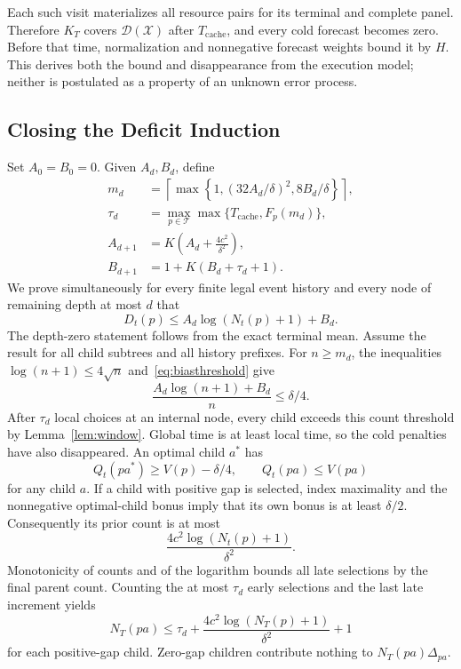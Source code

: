 Each such visit materializes all resource pairs for its terminal and complete panel. Therefore $K_T$ covers $\mathcal D(\mathcal X)$ after $T_{\mathrm{cache}}$, and every cold forecast becomes zero. Before that time, normalization and nonnegative forecast weights bound it by $H$. This derives both the bound and disappearance from the execution model; neither is postulated as a property of an unknown error process.

\subsection{Closing the Deficit Induction}
Set $A_0=B_0=0$. Given $A_d,B_d$, define
\begin{align}
 m_d&=\left\lceil\max\left\{1,
             (32A_d/\delta)^2,8B_d/\delta\right\}\right\rceil,
 \label{eq:biasthreshold}\\
 \tau_d&=\max_{p\in\mathcal T}\max\{T_{\mathrm{cache}},F_p(m_d)\},\nonumber\\
 A_{d+1}&=K\left(A_d+\frac{4c^2}{\delta^2}\right),\nonumber\\
 B_{d+1}&=1+K(B_d+\tau_d+1).\nonumber
\end{align}
We prove simultaneously for every finite legal event history and every node of remaining depth at most $d$ that
\begin{equation}
 D_t(p)\le A_d\log(N_t(p)+1)+B_d.
 \label{eq:subtreebound}
\end{equation}
The depth-zero statement follows from the exact terminal mean. Assume the result for all child subtrees and all history prefixes. For $n\ge m_d$, the inequalities $\log(n+1)\le4\sqrt n$ and~\eqref{eq:biasthreshold} give
\[
 \frac{A_d\log(n+1)+B_d}{n}\le\delta/4.
\]
After $\tau_d$ local choices at an internal node, every child exceeds this count threshold by Lemma~\ref{lem:window}. Global time is at least local time, so the cold penalties have also disappeared. An optimal child $a^*$ has
\[
 Q_t(pa^*)\ge V(p)-\delta/4,
 \qquad Q_t(pa)\le V(pa)
\]
for any child $a$. If a child with positive gap is selected, index maximality and the nonnegative optimal-child bonus imply that its own bonus is at least $\delta/2$. Consequently its prior count is at most
\[
 \frac{4c^2\log(N_t(p)+1)}{\delta^2}.
\]
Monotonicity of counts and of the logarithm bounds all late selections by the final parent count. Counting the at most $\tau_d$ early selections and the last late increment yields
\begin{equation}
 N_T(pa)\le\tau_d+\frac{4c^2\log(N_T(p)+1)}{\delta^2}+1
 \label{eq:childcount}
\end{equation}
for each positive-gap child. Zero-gap children contribute nothing to $N_T(pa)\Delta_{pa}$.

